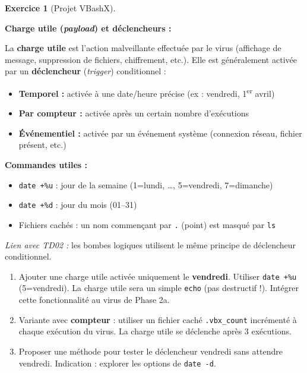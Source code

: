 \documentclass[a4paper,11pt]{article}
\theoremstyle{plain}
\theoremstyle{definition}
\newtheorem{exercice}{Exercice}
\begin{document}
\begin{exercice}[Projet VBashX]
\begin{rappel}
\textbf{Charge utile (\textit{payload}) et déclencheurs :}

La \textbf{charge utile} est l'action malveillante effectuée par le virus (affichage de message, suppression de fichiers, chiffrement, etc.). Elle est généralement activée par un \textbf{déclencheur} (\textit{trigger}) conditionnel :

\begin{itemize}
    \item \textbf{Temporel :} activée à une date/heure précise (ex : vendredi, 1\textsuperscript{er} avril)
    \item \textbf{Par compteur :} activée après un certain nombre d'exécutions
    \item \textbf{Événementiel :} activée par un événement système (connexion réseau, fichier présent, etc.)
\end{itemize}

\textbf{Commandes utiles :}
\begin{itemize}
    \item \texttt{date +\%u} : jour de la semaine (1=lundi, \ldots, 5=vendredi, 7=dimanche)
    \item \texttt{date +\%d} : jour du mois (01--31)
    \item Fichiers cachés : un nom commençant par \texttt{.} (point) est masqué par \texttt{ls}
\end{itemize}

\textit{Lien avec TD02 :} les bombes logiques utilisent le même principe de déclencheur conditionnel.
\end{rappel}

\begin{enumerate}
\item[\textbf{3a)}] Ajouter une charge utile activée uniquement le \textbf{vendredi}. Utiliser \texttt{date +\%u} (5=vendredi). La charge utile sera un simple \texttt{echo} (pas destructif !). Intégrer cette fonctionnalité au virus de Phase 2a.

\item[\textbf{3b)}] Variante avec \textbf{compteur} : utiliser un fichier caché \texttt{.vbx\_count} incrémenté à chaque exécution du virus. La charge utile se déclenche après 3 exécutions.

\item[\textbf{3c)}] Proposer une méthode pour tester le déclencheur vendredi sans attendre vendredi. Indication : explorer les options de \texttt{date -d}.
\end{enumerate}


\end{exercice}
\end{document}
